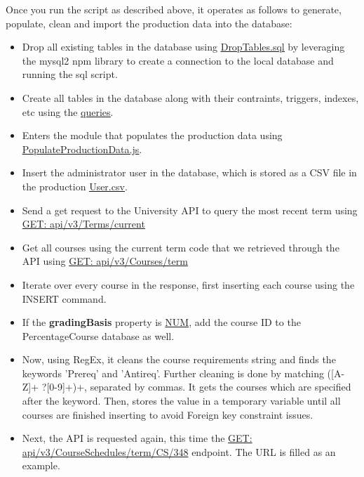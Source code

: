 \documentclass[12pt, a4paper]{article}
\begin{document}
Once you run the script as described above, it operates as follows to generate, populate, clean and import the production data into the database:
\begin{itemize}
    \item Drop all existing tables in the database using \underline{\href{https://github.com/Kggupta/DegreeMap/blob/main/Database/Queries/DropTables.sql}{DropTables.sql}} by leveraging the mysql2 npm library to create a connection to the local database and running the sql script.
    \item Create all tables in the database along with their contraints, triggers, indexes, etc using the \underline{\href{https://github.com/Kggupta/DegreeMap/blob/main/Database/Queries}{queries}}.
    \item Enters the module that populates the production data using \underline{\href{https://github.com/Kggupta/DegreeMap/blob/main/Database/src/PopulateProductionData.js}{PopulateProductionData.js}}.
    \item Insert the administrator user in the database, which is stored as a CSV file in the production \underline{\href{https://github.com/Kggupta/DegreeMap/blob/main/Database/DataFiles/Prod/User.csv}{User.csv}}.
    \item Send a get request to the University API to query the most recent term using \href{https://openapi.data.uwaterloo.ca/v3/Terms/current}{GET: api/v3/Terms/current}
    \item Get all courses using the current term code that we retrieved through the API using \href{https://openapi.data.uwaterloo.ca/v3/Courses/1235}{GET: api/v3/Courses/term}
    \item Iterate over every course in the response, first inserting each course using the INSERT command.
    \item If the \textbf{gradingBasis} property is \underline{NUM}, add the course ID to the PercentageCourse database as well.
    \item Now, using RegEx, it cleans the course requirements string and finds the keywords 'Prereq' and 'Antireq'. Further cleaning is done by matching ([A-Z]+ ?[0-9]+)+, separated by commas. It gets the courses which are specified after the keyword. Then, stores the value in a temporary variable until all courses are finished inserting to avoid Foreign key constraint issues.
    \item Next, the API is requested again, this time the \href{https://openapi.data.uwaterloo.ca/v3/CourseSchedules/term/subject/coursenumber}{GET: api/v3/CourseSchedules/term/CS/348} endpoint. The URL is filled as an example.

\end{itemize}
\end{document}
